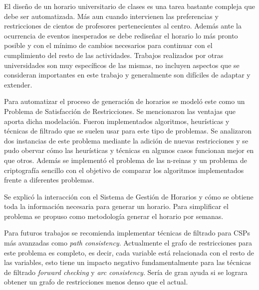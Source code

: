 \begin{conclusions}

El diseño de un horario universitario de clases es una tarea bastante compleja que debe ser automatizada. M\'as aun cuando intervienen las preferencias y restricciones de cientos de profesores pertenecientes al centro. Adem\'as ante la ocurrencia de eventos inesperados se debe rediseñar el horario lo m\'as pronto posible y con el m\'inimo de cambios necesarios para continuar con el cumplimiento del resto de las actividades. Trabajos realizados por otras universidades son muy espec\'ificos de las mismas, no incluyen aspectos que se consideran importantes en este trabajo y generalmente son dif\'iciles de adaptar y extender.

Para automatizar el proceso de generaci\'on de horarios se model\'o este como un Problema de Satisfacci\'on de Restricciones. Se mencionaron las ventajas que aporta dicha modelaci\'on. Fueron implementados algoritmos, heur\'isticas y t\'ecnicas de filtrado que se suelen usar para este tipo de problemas. Se analizaron dos instancias de este problema mediante la adici\'on de nuevas restricciones y se pudo obervar c\'omo las heur\'isticas y t\'ecnicas en algunos casos funcionan mejor en que otros. Adem\'as se implement\'o el problema de las n-reinas y un problema de criptograf\'ia sencillo con el objetivo de comparar los algoritmos implementados frente a diferentes problemas.

Se explic\'o la interacci\'on con el Sistema de Gesti\'on de Horarios y c\'omo se obtiene toda la informaci\'on necesaria para generar un horario. Para simplificar el problema se propuso como metodolog\'ia generar el horario por semanas.

Para futuros trabajos se recomienda implementar t\'ecnicas de filtrado para CSPs m\'as avanzadas como \emph{path consistency}. Actualmente el grafo de restricciones para este problema es completo, es decir, cada variable est\'a relacionada con el resto de las variables, esto tiene un impacto negativo fundamentalmente para las t\'ecnicas de filtrado \emph{forward checking} y \emph{arc consistency}. Ser\'ia de gran ayuda si se lograra obtener un grafo de restricciones menos denso que el actual.

\end{conclusions}